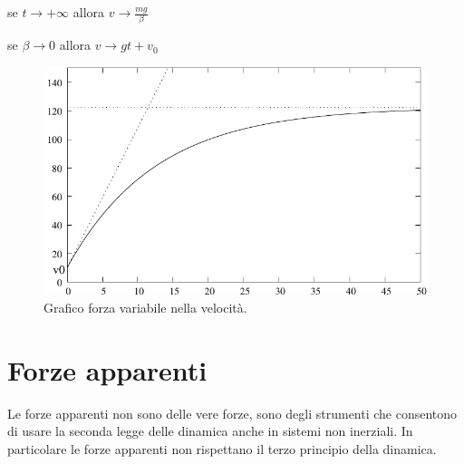 se $t\rightarrow +\infty$ allora $v\rightarrow\frac{mg}{\beta}$

se $\beta\rightarrow 0$ allora $v\rightarrow gt+v_0$
\begin{figure}[htbp]
  \centering
  \includegraphics[scale=1]{immagini/fisica1/grafico_forze_nella_velocita}
  \caption{Grafico forza variabile nella velocità.}
\end{figure}

\section{Forze apparenti}
Le forze apparenti non sono delle vere forze, sono degli strumenti che consentono di usare la seconda legge delle dinamica anche in sistemi non inerziali. In particolare le forze apparenti non rispettano il terzo principio della dinamica.

